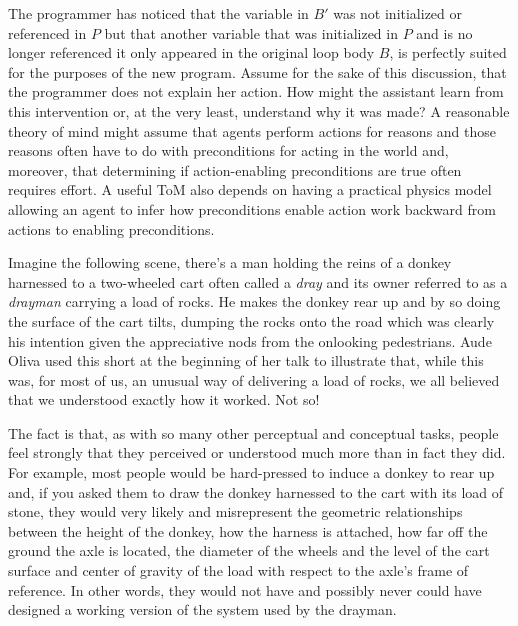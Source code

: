 The programmer has noticed that the variable in $B'$ was not initialized or referenced in $P$ but that another variable that was initialized in $P$ and is no longer referenced \emdash{} it only appeared in the original loop body $B$, is perfectly suited for the purposes of the new program. Assume for the sake of this discussion, that the programmer does not explain her action. How might the assistant learn from this intervention or, at the very least, understand why it was made? A reasonable theory of mind might assume that agents perform actions for reasons and those reasons often have to do with preconditions for acting in the world and, moreover, that determining if action-enabling preconditions are true often requires effort. A useful ToM also depends on having a practical physics model allowing an agent to infer how preconditions enable action work backward from actions to enabling preconditions. 


Imagine the following scene, there's a man holding the reins of a donkey harnessed to a two-wheeled cart \emdash{} often called a {\it{dray}} and its owner referred to as a {\it{drayman}} \emdash{} carrying a load of rocks. He makes the donkey rear up and by so doing the surface of the cart tilts, dumping the rocks onto the road which was clearly his intention given the appreciative nods from the onlooking pedestrians. Aude Oliva used this short {} at the beginning of her talk to illustrate that, while this was, for most of us, an unusual way of delivering a load of rocks, we all believed that we understood exactly how it worked. Not so!

The fact is that, as with so many other perceptual and conceptual tasks, people feel strongly that they perceived or understood much more than in fact they did. For example, most people would be hard-pressed to induce a donkey to rear up and, if you asked them to draw the donkey harnessed to the cart with its load of stone, they would very likely and misrepresent the geometric relationships between the height of the donkey, how the harness is attached, how far off the ground the axle is located, the diameter of the wheels and the level of the cart surface and center of gravity of the load with respect to the axle's frame of reference. In other words, they would not have \emdash{} and possibly never could have \emdash{} designed a working version of the system used by the drayman.

